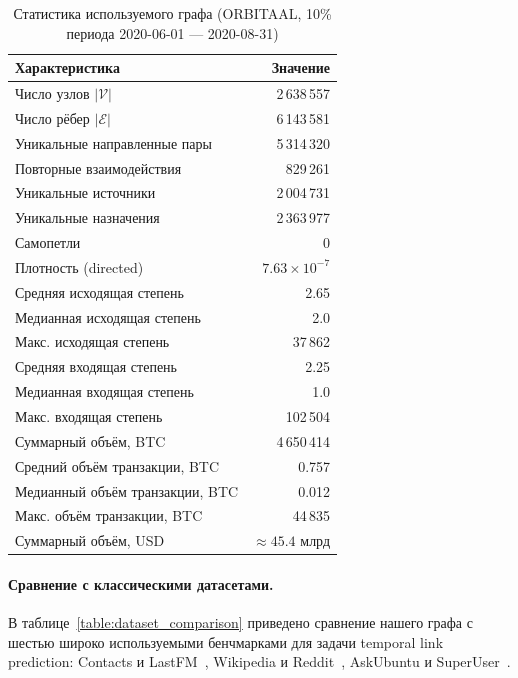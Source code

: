 \documentclass[a4paper,12pt]{extarticle}
\begin{document}
\begin{table}[ht]
    \caption{Статистика используемого графа (ORBITAAL, 10\% периода 2020-06-01 --- 2020-08-31)}
    \label{table:dataset_stats}
    \footnotesize
    \centering
    \begin{tabular}{lr}
        \toprule
        Характеристика & Значение \\
        \midrule
        Число узлов $|\mathcal{V}|$ & 2\,638\,557 \\
        Число рёбер $|\mathcal{E}|$ & 6\,143\,581 \\
        Уникальные направленные пары & 5\,314\,320 \\
        Повторные взаимодействия & 829\,261 \\
        Уникальные источники & 2\,004\,731 \\
        Уникальные назначения & 2\,363\,977 \\
        Самопетли & 0 \\
        Плотность (directed) & $7.63 \times 10^{-7}$ \\
        \midrule
        Средняя исходящая степень & 2.65 \\
        Медианная исходящая степень & 2.0 \\
        Макс. исходящая степень & 37\,862 \\
        Средняя входящая степень & 2.25 \\
        Медианная входящая степень & 1.0 \\
        Макс. входящая степень & 102\,504 \\
        \midrule
        Суммарный объём, BTC & 4\,650\,414 \\
        Средний объём транзакции, BTC & 0.757 \\
        Медианный объём транзакции, BTC & 0.012 \\
        Макс. объём транзакции, BTC & 44\,835 \\
        Суммарный объём, USD & $\approx 45.4$ млрд \\
        \bottomrule
    \end{tabular}
\end{table}

\paragraph{Сравнение с классическими датасетами.}
В таблице~\ref{table:dataset_comparison} приведено сравнение нашего графа с шестью широко используемыми бенчмарками для задачи temporal link prediction: Contacts и LastFM~\cite{poursafaei2022towards}, Wikipedia и Reddit~\cite{kumar2019predicting}, AskUbuntu и SuperUser~\cite{paranjape2017motifs}.
\end{document}
